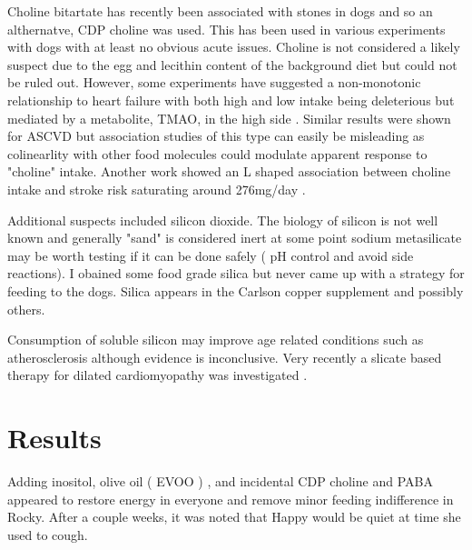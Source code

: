 Choline bitartate has recently been associated with stones in dogs
\cite{PMC12035869}
and so an althernatve, CDP choline was used.
This has been used in various experiments with dogs
\cite{PMC9151482}
\cite{PMID34715589}
with at least no obvious acute issues. 
 Choline is not considered
a likely suspect due to the egg and lecithin content of the background
diet but could not be ruled out. 
However, some experiments have suggested a non-monotonic relationship
to heart failure with both high and low intake being deleterious
 but mediated by a metabolite, TMAO, in the high side \cite{PMC7793226}.
Similar results were shown for ASCVD
\cite{Lin_Zhong_Zhang_inverse_association_2024} but
association studies of this type can easily be misleading as
colinearlity with other food molecules could modulate apparent
response to "choline" intake. 
Another work showed an L shaped association between choline intake
and stroke risk saturating around 276mg/day
\cite{Wang_Lin_Fan_Choline_consumption_reduces_2024}.

Additional suspects included silicon dioxide. The biology of silicon
is not well known and generally "sand" is considered inert
at some point sodium metasilicate may be worth testing if it can
be done safely ( pH control and avoid side reactions). 
I obained some food grade silica but never came up with a strategy
for feeding to the dogs. 
Silica appears in the Carlson copper supplement and possibly others.

Consumption of soluble silicon may improve age related conditions
such as atherosclerosis 
\cite{vv321ukaszDudek_vv322awKochman_Dziedzic_Silicon_prevention_2024}
although  evidence is inconclusive. 
Very recently a slicate based therapy for dilated cardiomyopathy
was investigated 
\cite{Sun_Zhang_Gao_Silicate_based_therapy_2025}.


\section{ Results }

Adding inositol, olive oil ( EVOO ) , and incidental CDP choline
and PABA appeared to restore energy in  everyone
and remove minor feeding indifference
in Rocky.  After a couple weeks, it was noted that Happy would be quiet
at time she used to cough. 


